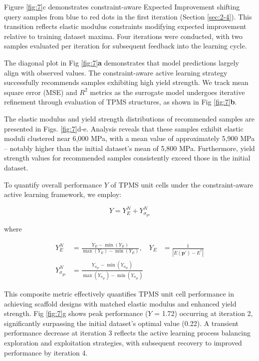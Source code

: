 \documentclass[preprint,review,12pt,authoryear]{elsarticle}
\begin{document}
Figure \ref{fig:7}c demonstrates constraint-aware Expected Improvement shifting query samples from blue to red dots in the first iteration (Section \ref{sec:2-4}). This transition reflects elastic modulus constraints modifying expected improvement relative to training dataset maxima. Four iterations were conducted, with two samples evaluated per iteration for subsequent feedback into the learning cycle.


The diagonal plot in Fig \ref{fig:7}\textbf{a} demonstrates that model predictions largely align with observed values. The constraint-aware active learning strategy successfully recommends samples exhibiting high yield strength. We track mean square error (MSE) and $R^2$ metrics as the surrogate model undergoes iterative refinement through evaluation of TPMS structures, as shown in Fig \ref{fig:7}\textbf{b}.

The elastic modulus and yield strength distributions of recommended samples are presented in Figs. \ref{fig:7}d-e. Analysis reveals that these samples exhibit elastic moduli clustered near 6,000 MPa, with a mean value of approximately 5,900 MPa – notably higher than the initial dataset's mean of 5,800 MPa. Furthermore, yield strength values for recommended samples consistently exceed those in the initial dataset.

To quantify overall performance $Y$ of TPMS unit cells under the constraint-aware active learning framework, we employ:

\begin{equation}
    Y = Y_E^N + Y_{\sigma_{ys}}^N \label{eq:23}
\end{equation}

where

\begin{equation}
\begin{aligned}
Y_E^N &= \frac{Y_E - \min(Y_E)}{\max(Y_E) - \min(Y_E)}, & Y_E &= \frac{1}{|E(\boldsymbol{p}') - E^*|} \\
Y_{\sigma_{ys}}^N &= \frac{Y_{\sigma_{ys}} - \min(Y_{\sigma_{ys}})}{\max(Y_{\sigma_{ys}}) - \min(Y_{\sigma_{ys}})}
\end{aligned}
\label{eq:24}
\end{equation}

This composite metric effectively quantifies TPMS unit cell performance in achieving scaffold designs with matched elastic modulus and enhanced yield strength. Fig \ref{fig:7}g shows peak performance ($Y$ = 1.72) occurring at iteration 2, significantly surpassing the initial dataset's optimal value (0.22). A transient performance decrease at iteration 3 reflects the active learning process balancing exploration and exploitation strategies, with subsequent recovery to improved performance by iteration 4.
\end{document}
